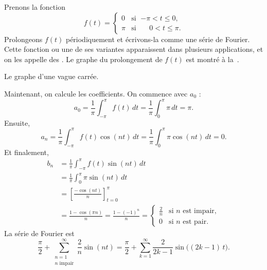 \begin{example}
Prenons la fonction
\begin{equation*}
f(t) =
\begin{cases}
0 & \text{si } \;{-\pi} < t \leq 0 , \\
\pi & \text{si } \;\phantom{-}0 < t \leq \pi .
\end{cases}
\end{equation*}
\nopagebreak[4]%
Prolongeons $f(t)$ périodiquement et écrivons-la comme une série de Fourier.  Cette fonction ou une de ses variantes apparaissent dans plusieurs applications, et on les appelle des 
\emph{}. Le graphe du prolongement de $f(t)$ est montré à la~.

\begin{myfig}
\capstart
{}
\caption{Le graphe d'une vague carrée.\label{ts:squarewavefig}}
\end{myfig}

Maintenant, on calcule les coefficients. On commence avec $a_0$ :
\begin{equation*}
a_0 = \frac{1}{\pi} \int_{-\pi}^\pi f(t) \,dt
= \frac{1}{\pi} \int_{0}^\pi \pi \,dt = \pi .
\end{equation*}
Ensuite,
\begin{equation*}
a_n = \frac{1}{\pi} \int_{-\pi}^\pi f(t) \cos (nt) \,dt 
= \frac{1}{\pi} \int_{0}^\pi \pi \cos (nt) \,dt = 0 .
\end{equation*}
Et finalement,
\begin{equation*}
\begin{split}
b_n & = \frac{1}{\pi} \int_{-\pi}^\pi f(t) \sin (nt) \,dt \\
& = \frac{1}{\pi} \int_{0}^\pi \pi \sin (nt) \,dt \\
& = \left[ \frac{- \cos (nt)}{n} \right]_{t=0}^\pi \\
& = \frac{1 - \cos (\pi n)}{n}
= \frac{1 - {(-1)}^n}{n}
=
\begin{cases}
\frac{2}{n} & \text{si } n \text{ est impair} , \\
0 & \text{si } n \text{ est pair} .
\end{cases}
\end{split}
\end{equation*}
La série de Fourier est
\begin{equation*}
\frac{\pi}{2} +  \sum_{\substack{n=1\\n \text{ impair}}}^\infty
\frac{2}{n} 
\sin (n t)
=
\frac{\pi}{2} + \sum_{k=1}^\infty
\frac{2}{2k-1} 
\sin \bigl( (2k-1)\, t \bigr) .
\end{equation*}


\end{example}
